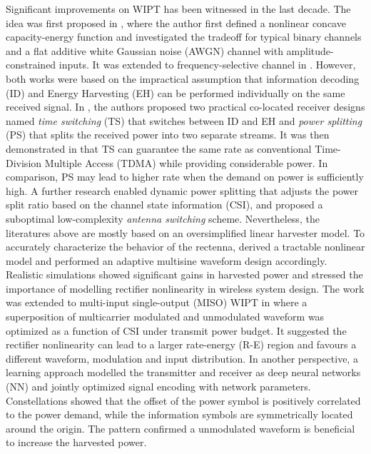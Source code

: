 Significant improvements on WIPT has been witnessed in the last decade. The idea was first proposed in \cite{R.Varshney2008}, where the author first defined a nonlinear concave capacity-energy function and investigated the tradeoff for typical binary channels and a flat additive white Gaussian noise (AWGN) channel with amplitude-constrained inputs. It was extended to frequency-selective channel in \cite{Grover2010}. However, both works were based on the impractical assumption that information decoding (ID) and Energy Harvesting (EH) can be performed individually on the same received signal. In \cite{Zhang2013}, the authors proposed two practical co-located receiver designs named \textit{time switching} (TS) that switches between ID and EH and \textit{power splitting} (PS) that splits the received power into two separate streams. It was then demonstrated in \cite{Zhou2013a} that TS can guarantee the same rate as conventional Time-Division Multiple Access (TDMA) while providing considerable power. In comparison, PS may lead to higher rate when the demand on power is sufficiently high. A further research \cite{Liu2013} enabled dynamic power splitting that adjusts the power split ratio based on the channel state information (CSI), and proposed a suboptimal low-complexity \textit{antenna switching} scheme. Nevertheless, the literatures above are mostly based on an oversimplified linear harvester model. To accurately characterize the behavior of the rectenna, \cite{Clerckx2016} derived a tractable nonlinear model and performed an adaptive multisine waveform design accordingly. Realistic simulations showed significant gains in harvested power and stressed the importance of modelling rectifier nonlinearity in wireless system design. The work was extended to multi-input single-output (MISO) WIPT in \cite{Clerckx2018} where a superposition of multicarrier modulated and unmodulated waveform was optimized as a function of CSI under transmit power budget. It suggested the rectifier nonlinearity can lead to a larger rate-energy (R-E) region and favours a different waveform, modulation and input distribution. In another perspective, a learning approach \cite{Varasteh2018} modelled the transmitter and receiver as deep neural networks (NN) and jointly optimized signal encoding with network parameters. Constellations showed that the offset of the power symbol is positively correlated to the power demand, while the information symbols are symmetrically located around the origin. The pattern confirmed a unmodulated waveform is beneficial to increase the harvested power.
